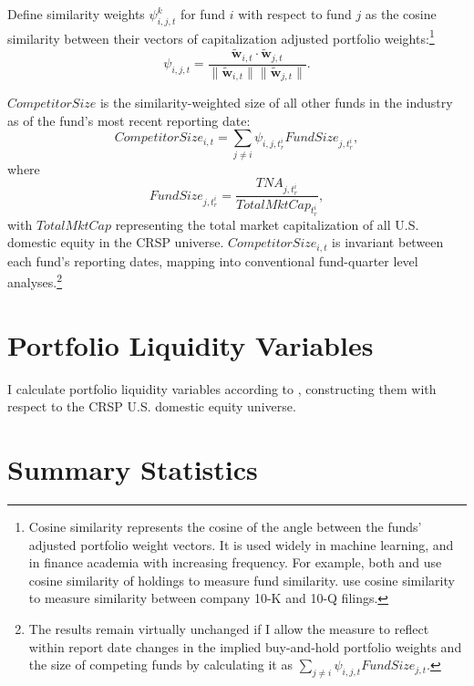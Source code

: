 \documentclass[openany]{book}
\let\rmarkdownfootnote\footnote%
\def\footnote{\protect\rmarkdownfootnote}
\theoremstyle{definition}
\theoremstyle{definition}
\theoremstyle{definition}
\theoremstyle{remark}
\begin{document}
Define similarity weights \(\psi_{i,j,t}^k\) for fund \(i\) with respect
to fund \(j\) as the cosine similarity between their vectors of
capitalization adjusted portfolio weights:\footnote{Cosine similarity
  represents the cosine of the angle between the funds' adjusted
  portfolio weight vectors. It is used widely in machine learning, and
  in finance academia with increasing frequency. For example, both
  \citet{blocher16} and \citet{hkp17} use cosine similarity of holdings
  to measure fund similarity. \citet{lmn16} use cosine similarity to
  measure similarity between company 10-K and 10-Q filings.}
\begin{equation}
\psi_{i,j,t} = \frac{ \mathbf{\tilde{w}}_{i,t} \cdot \mathbf{\tilde{w}}_{j,t} }{ \| \mathbf{\tilde{w}}_{i,t} \|  \| \mathbf{\tilde{w}}_{j,t} \| }.
\end{equation}

\(CompetitorSize\) is the similarity-weighted size of all other funds in
the industry as of the fund's most recent reporting date:
\begin{equation}
CompetitorSize_{i,t} = \sum_{j\neq i} \psi_{i,j,t^i_r} FundSize_{j,t^i_r},
\end{equation} where \begin{equation}
FundSize_{j,t^i_r}=\frac{TNA_{j,t^i_r}}{TotalMktCap_{t^i_r}},
\end{equation} with \(TotalMktCap\) representing the total market
capitalization of all U.S. domestic equity in the CRSP universe.
\(CompetitorSize_{i,t}\) is invariant between each fund's reporting
dates, mapping into conventional fund-quarter level analyses.\footnote{The
  results remain virtually unchanged if I allow the measure to reflect
  within report date changes in the implied buy-and-hold portfolio
  weights and the size of competing funds by calculating it as
  \(\sum_{j\neq i}\psi_{i,j,t} FundSize_{j,t}\).}

\hypertarget{portfolio-liquidity-variables}{%
\section{Portfolio Liquidity
Variables}\label{portfolio-liquidity-variables}}

I calculate portfolio liquidity variables according to \citet{pst17L},
constructing them with respect to the CRSP U.S. domestic equity
universe.

\hypertarget{sec:sumStats}{%
\section{Summary Statistics}\label{sec:sumStats}}
\end{document}
